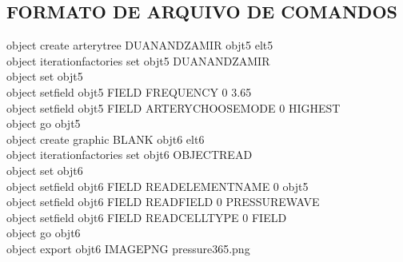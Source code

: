 \begin{appendices}
	
	
	\chapter{FORMATO DE ARQUIVO DE COMANDOS}\label{annex2}
	
	\begin{algorithm}[H]
		\SetAlgoLined
		object create artery\underline{\space\space}tree DUAN\underline{\space\space}AND\underline{\space\space}ZAMIR obj\underline{\space\space}t5 el\underline{\space\space}t5 \\
		object iteration\underline{\space\space}factories set obj\underline{\space\space}t5 DUAN\underline{\space\space}AND\underline{\space\space}ZAMIR \\
		object set obj\underline{\space\space}t5 \\
		object set\underline{\space\space}field obj\underline{\space\space}t5 FIELD FREQUENCY 0 3.65 \\
		object set\underline{\space\space}field obj\underline{\space\space}t5 FIELD ARTERY\underline{\space\space}CHOOSE\underline{\space\space}MODE 0 HIGHEST \\
		object go obj\underline{\space\space}t5 \\
		object create graphic BLANK obj\underline{\space\space}t6 el\underline{\space\space}t6 \\
		object iteration\underline{\space\space}factories set obj\underline{\space\space}t6 OBJECT\underline{\space\space}READ \\
		object set obj\underline{\space\space}t6 \\
		object set\underline{\space\space}field obj\underline{\space\space}t6 FIELD READ\underline{\space\space}ELEMENT\underline{\space\space}NAME 0 obj\underline{\space\space}t5 \\
		object set\underline{\space\space}field obj\underline{\space\space}t6 FIELD READ\underline{\space\space}FIELD 0 PRESSURE\underline{\space\space}WAVE \\
		object set\underline{\space\space}field obj\underline{\space\space}t6 FIELD READ\underline{\space\space}CELL\underline{\space\space}TYPE 0 FIELD \\
		object go obj\underline{\space\space}t6 \\
		object export obj\underline{\space\space}t6 IMAGE\underline{\space\space}PNG pressure\underline{\space\space}3\underline{\space\space}65.png \\

\end{algorithm}
\end{appendices}
